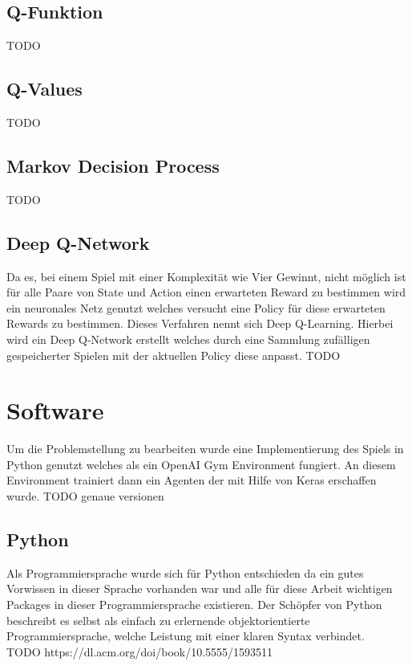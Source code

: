 \subsection{Q-Funktion}
\colorbox{red!30}{TODO} %

\subsection{Q-Values}
\colorbox{red!30}{TODO} %

\subsection{Markov Decision Process}
\colorbox{red!30}{TODO} %

\subsection{Deep Q-Network}
Da es, bei einem Spiel mit einer Komplexität wie Vier Gewinnt, nicht möglich ist für alle Paare von State und Action einen erwarteten Reward zu bestimmen wird ein neuronales Netz genutzt welches versucht eine Policy für diese erwarteten Rewards zu bestimmen. Dieses Verfahren nennt sich Deep Q-Learning. Hierbei wird ein Deep Q-Network erstellt welches durch eine Sammlung zufälligen gespeicherter Spielen mit der aktuellen Policy diese anpasst.
\colorbox{red!30}{TODO} %









\section{Software}
Um die Problemstellung zu bearbeiten wurde eine Implementierung des Spiels in Python genutzt welches als ein OpenAI Gym Environment fungiert. An diesem Environment trainiert dann ein Agenten der mit Hilfe von  Keras erschaffen wurde.
\colorbox{red!30}{TODO genaue versionen}

\subsection{Python}
Als Programmiersprache wurde sich für Python entschieden da ein gutes Vorwissen in dieser Sprache vorhanden war und alle für diese Arbeit wichtigen Packages in dieser Programmiersprache existieren.
Der Schöpfer von Python beschreibt es selbst als einfach zu erlernende objektorientierte Programmiersprache, welche Leistung mit einer klaren Syntax verbindet.\\
\colorbox{red!30}{TODO https://dl.acm.org/doi/book/10.5555/1593511}

